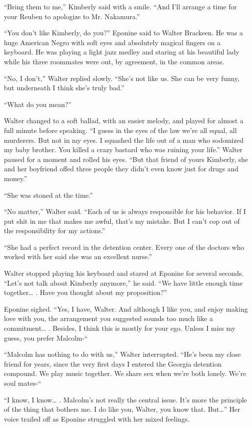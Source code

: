 \documentclass[]{article}
\begin{document}
{“Bring them to me,” Kimberly said with a smile. “And I’ll arrange a time for your Reuben to apologize to Mr. Nakamura.”

“You don’t like Kimberly, do you?” Eponine said to Walter Brackeen. He was a huge American Negro with soft eyes and absolutely magical fingers on a keyboard. He was playing a light jazz medley and staring at his beautiful lady while his three roommates were out, by agreement, in the common areas.

“No, I don’t,” Walter replied slowly. “She’s not like us. She can be very funny, but underneath I think she’s truly bad.”

“What do you mean?”

Walter changed to a soft ballad, with an easier melody, and played for almost a full minute before speaking. “I guess in the eyes of the law we’re all equal, all murderers. But not in my eyes. I squashed the life out of a man who sodomized my baby brother. You killed a crazy bastard who was ruining your life.” Walter paused for a moment and rolled his eyes. “But that friend of yours Kimberly, she and her boyfriend offed three people they didn’t even know just for drugs and money.”

“She was stoned at the time.”

“No matter,” Walter said. “Each of us is always responsible for his behavior. If I put shit in me that makes me awful, that’s my mistake. But I can’t cop out of the responsibility for my actions.”

“She had a perfect record in the detention center. Every one of the doctors who worked with her said she was an excellent nurse.”

Walter stopped playing his keyboard and stared at Eponine for several seconds. “Let’s not talk about Kimberly anymore,” he said. “We have little enough time together… . Have you thought about my proposition?”

Eponine sighed. “Yes, I have, Walter. And although I like you, and enjoy making love with you, the arrangement you suggested sounds too much like a commitment… . Besides, I think this is mostly for your ego. Unless I miss my guess, you prefer Malcolm-“

“Malcolm has nothing to do with us,” Walter interrupted. “He’s been my close friend for years, since the very first days I entered the Georgia detention compound. We play music together. We share sex when we’re both lonely. We’re soul mates-“

“I know, I know… . Malcolm’s not really the central issue. It’s more the principle of the thing that bothers me. I do like you, Walter, you know that. But…” Her voice trailed off as Eponine struggled with her mixed feelings.

}
\end{document}
